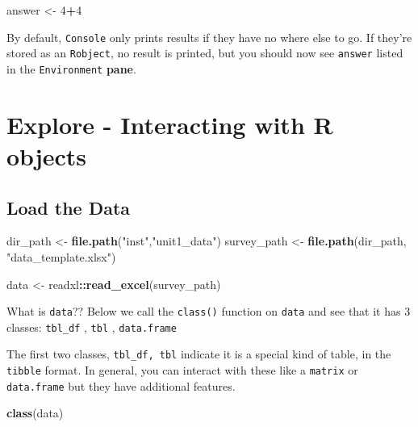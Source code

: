 \documentclass[
]{book}
\newenvironment{Shaded}{\begin{snugshade}}{\end{snugshade}}
\newcommand{\DecValTok}[1]{\textcolor[rgb]{0.00,0.00,0.81}{#1}}
\newcommand{\FunctionTok}[1]{\textcolor[rgb]{0.13,0.29,0.53}{\textbf{#1}}}
\newcommand{\NormalTok}[1]{#1}
\newcommand{\OtherTok}[1]{\textcolor[rgb]{0.56,0.35,0.01}{#1}}
\newcommand{\SpecialCharTok}[1]{\textcolor[rgb]{0.81,0.36,0.00}{\textbf{#1}}}
\newcommand{\StringTok}[1]{\textcolor[rgb]{0.31,0.60,0.02}{#1}}
\begin{document}
\begin{Shaded}
\begin{Highlighting}[]
\NormalTok{answer }\OtherTok{\textless{}{-}} \DecValTok{4}\SpecialCharTok{+}\DecValTok{4}
\end{Highlighting}
\end{Shaded}

By default, \texttt{Console} only prints results if they have no where else to go. If they're stored as an \texttt{Robject}, no result is printed, but you should now see \texttt{answer} listed in the \texttt{Environment} \textbf{pane}.

\hypertarget{explore---interacting-with-r-objects}{%
\section*{Explore - Interacting with R objects}\label{explore---interacting-with-r-objects}}

\hypertarget{load-the-data}{%
\subsection{Load the Data}\label{load-the-data}}

\begin{Shaded}
\begin{Highlighting}[]
\NormalTok{dir\_path }\OtherTok{\textless{}{-}} \FunctionTok{file.path}\NormalTok{(}\StringTok{"inst"}\NormalTok{,}\StringTok{"unit1\_data"}\NormalTok{)}
\NormalTok{survey\_path }\OtherTok{\textless{}{-}} \FunctionTok{file.path}\NormalTok{(dir\_path, }\StringTok{"data\_template.xlsx"}\NormalTok{)}

\NormalTok{data }\OtherTok{\textless{}{-}}\NormalTok{ readxl}\SpecialCharTok{::}\FunctionTok{read\_excel}\NormalTok{(survey\_path)}
\end{Highlighting}
\end{Shaded}

What is \texttt{data}?? Below we call the \texttt{class()} function on \texttt{data} and see that it has 3 classes:
\texttt{tbl\_df} , \texttt{tbl} , \texttt{data.frame}

The first two classes, \texttt{tbl\_df,\ tbl} indicate it is a special kind of table, in the \texttt{tibble} format. In general, you can interact with these like a \texttt{matrix} or \texttt{data.frame} but they have additional features.

\begin{Shaded}
\begin{Highlighting}[]
\FunctionTok{class}\NormalTok{(data)}
\end{Highlighting}
\end{Shaded}
\end{document}

